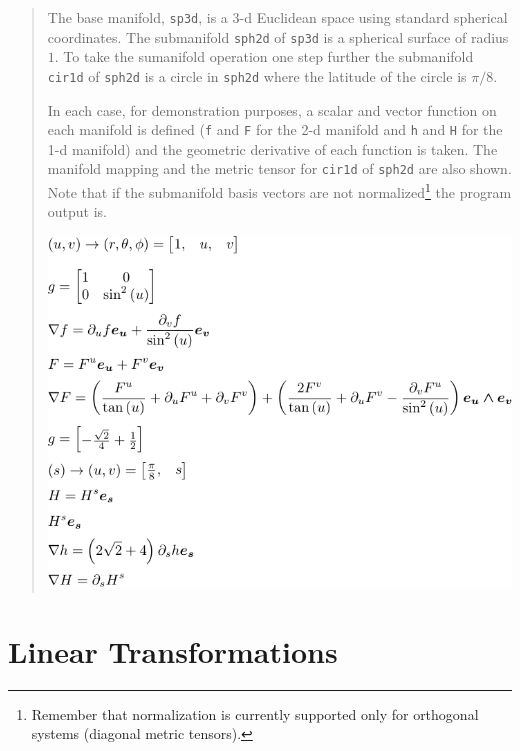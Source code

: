 \documentclass[12pt]{report}
\newcommand{\T}[1]{\texttt{#1}}
\begin{document}
\begin{quote}
    The base manifold, \T{sp3d}, is a 3-d Euclidean space using standard spherical coordinates. The submanifold
    \T{sph2d} of \T{sp3d} is a spherical surface of radius $1$.  To take the sumanifold operation one step further
    the submanifold \T{cir1d} of \T{sph2d} is a circle in \T{sph2d} where the latitude of the circle is $\pi/8$.

    In each case, for demonstration purposes, a scalar and vector function on each manifold is defined (\T{f} and \T{F}
    for the 2-d manifold and \T{h} and \T{H} for the 1-d manifold) and the geometric derivative of each function is taken.  The
    manifold mapping and the metric tensor for \T{cir1d} of \T{sph2d} are also shown. Note that if the submanifold basis vectors
    are not normalized\footnote{Remember that normalization is currently supported only for orthogonal systems (diagonal
    metric tensors).} the program output is.
    \begin{center}
    \includegraphics[scale=1]{python/submanifold1.pdf}
    \end{center}
\end{quote}

\section{Linear Transformations}
\end{document}
